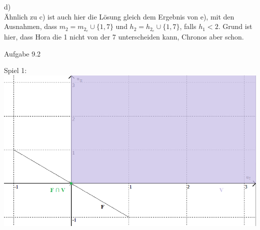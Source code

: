 \documentclass{scrartcl}
\begin{document}
d) \\

Ähnlich zu c) ist auch hier die Lösung gleich dem Ergebnis von e), mit den Ausnahmen, dass
$m_2 = m_{2_e} \cup \{1, 7\}$ und $h_2 = h_{2_e} \cup \{1, 7\}$, falls $h_1 < 2$. Grund ist hier,
dass Hora die 1 nicht von der 7 unterscheiden kann, Chronos aber schon. \clearpage

\begin{Large}
Aufgabe 9.2\\[0.0cm]
\end{Large}

Spiel 1: \\

\includegraphics[width=1\textwidth]{graph_2a.png}
\end{document}
